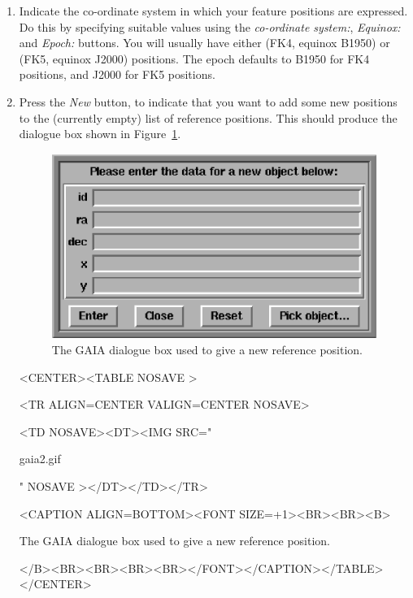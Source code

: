\documentclass[twoside,11pt]{article}
\newenvironment{latexonly}{}{}
\newcommand{\latex}[1]{#1}
\newcommand{\html}[1]{}
\renewcommand{\_}{\texttt{\symbol{95}}}
\newcommand{\htmlfig}[3]{
   \label{#1}
   \begin{rawhtml} <CENTER><TABLE NOSAVE > \end{rawhtml}
   \begin{rawhtml} <TR ALIGN=CENTER VALIGN=CENTER NOSAVE> \end{rawhtml}
   \begin{rawhtml} <TD NOSAVE><DT><IMG SRC=" \end{rawhtml}
   #2
   \begin{rawhtml} " NOSAVE ></DT></TD></TR> \end{rawhtml}
   \begin{rawhtml} <CAPTION ALIGN=BOTTOM><FONT SIZE=+1><BR><BR><B> \end{rawhtml}
   #3 
   \begin{rawhtml} </B><BR><BR><BR><BR></FONT></CAPTION></TABLE></CENTER> \end{rawhtml}
}
\begin{document}
\begin{enumerate}
\begin{htmlonly}
\htmlfig{fig:gaia1}{gaia1.gif}{
The main GAIA dialogue box used to create an RA/DEC calibration.}
\end{htmlonly}

\item Indicate the co-ordinate system in which your feature positions are
expressed. Do this by specifying suitable values using the \emph{co-ordinate
system:}, \emph{Equinox:} and \emph{Epoch:} buttons. You will usually have
either (FK4, equinox B1950) or (FK5, equinox J2000) positions. The epoch 
defaults to B1950 for FK4 positions, and J2000 for FK5 positions.

\item Press the \emph{New} button, to indicate that you want to add some
new positions to the (currently empty) list of reference positions. This 
should produce the dialogue box shown in 
\latex{Figure~\ref{fig:gaia2}.} \html{the next figure:}

\begin{latexonly}
  \vspace{2mm}
  \begin{figure}[htb]
  \begin{center}
  \includegraphics[clip,scale=0.5]{sun223_figures/gaia2.eps}
  \caption{The GAIA dialogue box used to give a new reference position.}
  \label{fig:gaia2}
  \end{center}
  \end{figure}
\end{latexonly}

\begin{htmlonly}
\htmlfig{fig:gaia2}{gaia2.gif}{
The GAIA dialogue box used to give a new reference position.}
\end{htmlonly}


\end{enumerate}
\end{document}
